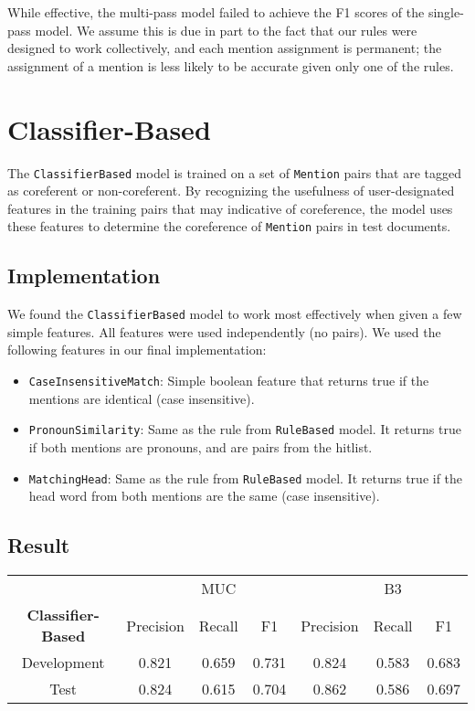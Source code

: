 \documentclass[12pt]{article}
\begin{document}
While effective, the multi-pass model failed to achieve the F1 scores of the single-pass model. We assume this is due in part to the fact that our rules were designed to work collectively, and each mention assignment is permanent; the assignment of a mention is less likely to be accurate given only one of the rules.

\section{Classifier-Based}
The \texttt{ClassifierBased} model is trained on a set of \texttt{Mention} pairs that are tagged as coreferent or non-coreferent. By recognizing the usefulness of user-designated features in the training pairs that may indicative of coreference, the model uses these features to determine the coreference of \texttt{Mention} pairs in test documents. 
\subsection{Implementation}
We found the \texttt{ClassifierBased} model to work most effectively when given a few simple features. All features were used independently (no pairs). We used the following features in our final implementation:
\begin{itemize}
\item \texttt{CaseInsensitiveMatch}: Simple boolean feature that returns true if the mentions are identical (case insensitive).
\item \texttt{PronounSimilarity}: Same as the rule from \texttt{RuleBased} model. It returns true if both mentions are pronouns, and are pairs from the hitlist. 
\item \texttt{MatchingHead}: Same as the rule from \texttt{RuleBased} model. It returns true if the head word from both mentions are the same (case insensitive).
\end{itemize}


\subsection{Result}
\begin{table}[ht] 
\centering %
\begin{tabular}{c | c c c | c c c} 
& & MUC & & & B3 \\ [0.5ex] %
\textbf{Classifier-Based} & Precision & Recall & F1 & Precision & Recall & F1 \\ [0.5ex] %
\hline %
Development & 0.821 & 0.659 & 0.731 & 0.824 & 0.583 & 0.683 \\
Test & 0.824 & 0.615 & 0.704 & 0.862 & 0.586 & 0.697\\
\end{tabular} 
\label{table:nonlin2}
\end{table}
\end{document}
